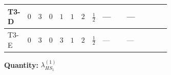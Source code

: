 \documentclass[8pt]{article}
\begin{document}
\begin{landscape}
\begin{longtable}{@{}llcccccc >{\raggedright\arraybackslash}p{0.21\linewidth} >{\raggedright\arraybackslash}p{0.21\linewidth} >{\raggedright\arraybackslash}p{0.21\linewidth}@{}}
\midrule
T3-D & $0$ & $3$ & $0$ & $1$ & $1$ & $2$ & $\frac{1}{2}$ & --- & --- & \scriptsize\adjustbox{max width=\linewidth}{$\begin{gathered} {\lambda_{HS_1}^{(1)}} (2 T_{\nu}^{(1)}+6 \operatorname{Tr}\!\left({Y_d}\,\left({Y_d}\right)^{\dagger}\right)+2 \operatorname{Tr}\!\left({Y_e}\,\left({Y_e}\right)^{\dagger}\right)+6 \operatorname{Tr}\!\left({Y_u}\,\left({Y_u}\right)^{\dagger}\right)+4 {\lambda_{S_1}^{(A)}})\end{gathered}$} \\
\midrule
T3-E & $0$ & $3$ & $0$ & $3$ & $1$ & $2$ & $\frac{1}{2}$ & --- & --- & \scriptsize\adjustbox{max width=\linewidth}{$\begin{gathered} {\lambda_{HS_1}^{(1)}} (2 T_{\nu}^{(1)}+6 \operatorname{Tr}\!\left({Y_d}\,\left({Y_d}\right)^{\dagger}\right)+2 \operatorname{Tr}\!\left({Y_e}\,\left({Y_e}\right)^{\dagger}\right)+6 \operatorname{Tr}\!\left({Y_u}\,\left({Y_u}\right)^{\dagger}\right)+4 {\lambda_{S_1}^{(A)}})\end{gathered}$} \\
\midrule
\bottomrule
\end{longtable}
\clearpage
\noindent\textbf{Quantity: }$\lambda_{HS_1}^{(1)}$\par\smallskip

\end{landscape}
\end{document}
